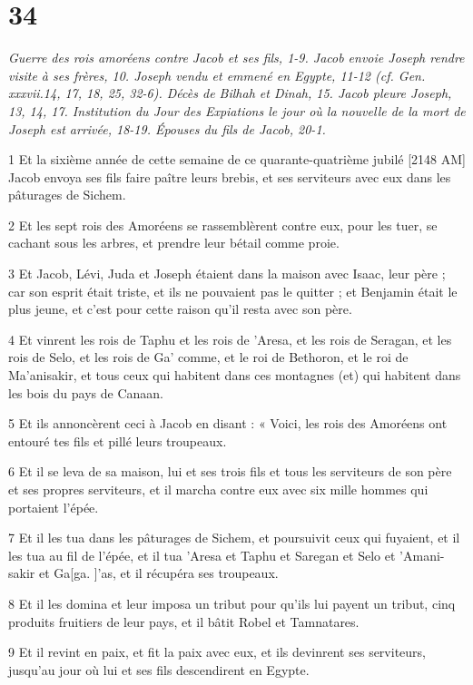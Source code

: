 \chapter{34}

\par \textit{Guerre des rois amoréens contre Jacob et ses fils, 1-9. Jacob envoie Joseph rendre visite à ses frères, 10. Joseph vendu et emmené en Egypte, 11-12 (cf. Gen. xxxvii.14, 17, 18, 25, 32-6). Décès de Bilhah et Dinah, 15. Jacob pleure Joseph, 13, 14, 17. Institution du Jour des Expiations le jour où la nouvelle de la mort de Joseph est arrivée, 18-19. Épouses du fils de Jacob, 20-1.}

\par 1 Et la sixième année de cette semaine de ce quarante-quatrième jubilé [2148 AM] Jacob envoya ses fils faire paître leurs brebis, et ses serviteurs avec eux dans les pâturages de Sichem.
\par 2 Et les sept rois des Amoréens se rassemblèrent contre eux, pour les tuer, se cachant sous les arbres, et prendre leur bétail comme proie.
\par 3 Et Jacob, Lévi, Juda et Joseph étaient dans la maison avec Isaac, leur père ; car son esprit était triste, et ils ne pouvaient pas le quitter ; et Benjamin était le plus jeune, et c'est pour cette raison qu'il resta avec son père.
\par 4 Et vinrent les rois de Taphu et les rois de 'Aresa, et les rois de Seragan, et les rois de Selo, et les rois de Ga' comme, et le roi de Bethoron, et le roi de Ma'anisakir, et tous ceux qui habitent dans ces montagnes (et) qui habitent dans les bois du pays de Canaan.
\par 5 Et ils annoncèrent ceci à Jacob en disant : « Voici, les rois des Amoréens ont entouré tes fils et pillé leurs troupeaux.
\par 6 Et il se leva de sa maison, lui et ses trois fils et tous les serviteurs de son père et ses propres serviteurs, et il marcha contre eux avec six mille hommes qui portaient l'épée.
\par 7 Et il les tua dans les pâturages de Sichem, et poursuivit ceux qui fuyaient, et il les tua au fil de l'épée, et il tua 'Aresa et Taphu et Saregan et Selo et 'Amani-sakir et Ga[ga. ]'as, et il récupéra ses troupeaux.
\par 8 Et il les domina et leur imposa un tribut pour qu'ils lui payent un tribut, cinq produits fruitiers de leur pays, et il bâtit Robel et Tamnatares.
\par 9 Et il revint en paix, et fit la paix avec eux, et ils devinrent ses serviteurs, jusqu'au jour où lui et ses fils descendirent en Egypte.
